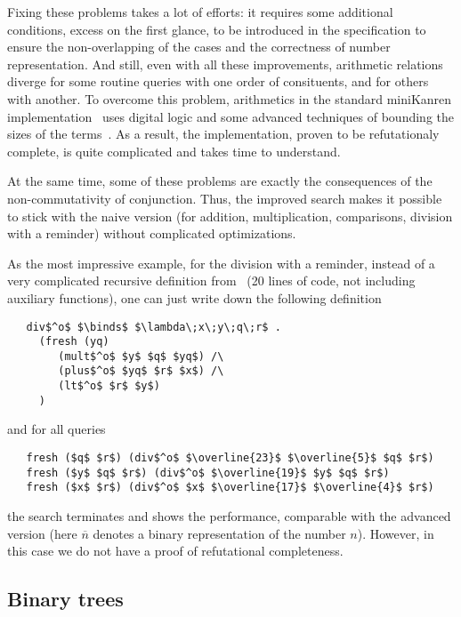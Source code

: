 Fixing these problems takes a lot of efforts: it requires some additional conditions, 
excess on the first glance, to be introduced in the specification to ensure the non-overlapping 
of the cases and the correctness of number representation. And still, even with all these 
improvements, arithmetic relations diverge for some routine queries with one order of 
consituents, and for others with another. To overcome this problem, arithmetics in the standard miniKanren
implementation~\cite{TRS} uses digital logic and some advanced techniques of bounding the sizes of
the terms~\cite{KiselyovArithmetic}. As a result, the implementation, proven to be refutationaly complete,
is quite complicated and takes time to understand. 

At the same time, some of these problems are exactly the consequences of the non-commutativity 
of conjunction. Thus, the improved search makes it possible to stick with the naive version (for addition,
multiplication, comparisons, division with a reminder) without complicated optimizations.  

As the most impressive example, for the division with a reminder, instead of a very complicated recursive definition 
from~\cite{TRS} (20 lines of code, not including auxiliary functions), one can just write down the 
following definition

\begin{lstlisting}
   div$^o$ $\binds$ $\lambda\;x\;y\;q\;r$ . 
     (fresh (yq)        
        (mult$^o$ $y$ $q$ $yq$) /\
        (plus$^o$ $yq$ $r$ $x$) /\
        (lt$^o$ $r$ $y$)
     )
\end{lstlisting}

\noindent and for all queries

\begin{lstlisting}
   fresh ($q$ $r$) (div$^o$ $\overline{23}$ $\overline{5}$ $q$ $r$)
   fresh ($y$ $q$ $r$) (div$^o$ $\overline{19}$ $y$ $q$ $r$)
   fresh ($x$ $r$) (div$^o$ $x$ $\overline{17}$ $\overline{4}$ $r$)
\end{lstlisting}

\noindent the search terminates and shows the performance, comparable with the advanced version 
(here $\overline{n}$ denotes a binary representation of the number $n$). However, in this case we do not
have a proof of refutational completeness.

\subsection{Binary trees}

